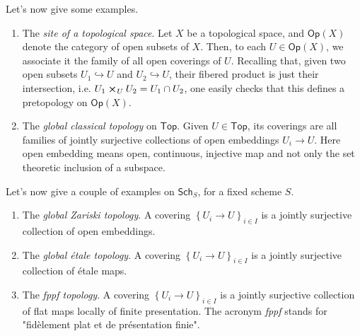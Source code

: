 \noindent
Let's now give some examples.
\begin{ex}\leavevmode\vspace{-.2\baselineskip}
\begin{enumerate}
	\item The {\em site of a topological space}.
		Let $X$ be a topological space, and $\mathsf{Op}(X)$ denote the category of
		open subsets of $X$.
		Then, to each $U \in \mathsf{Op}(X)$, we associate it the family of all
		open coverings of $U$.
		Recalling that, given two open subsets
		$U_1 \hookrightarrow  U$ and $U_2 \hookrightarrow  U$, 
		their fibered product is just their intersection, i.e. 
		$U_1 \cross_{ U } U_2 = U_1 \cap U_2$,
		one easily checks that this defines a pretopology on $\mathsf{Op}(X)$.


	\item The {\em global classical topology} on $\mathsf{Top}$.
		Given $U \in \mathsf{Top}$, its coverings are all families of jointly surjective
		collections of open embeddings $U_i \to U$.
		Here open embedding means open, continuous, injective map and not
		only the set theoretic inclusion of a subspace.



\end{enumerate}
Let's now give a couple of examples on $\mathsf{Sch}_{ S }$, for a fixed scheme $S$.
\begin{enumerate}[resume]
	\item The {\em global Zariski topology}.
		A covering $\left\{ U_{ i } \to U \right\}_{ i \in I }$ is a 
		jointly surjective collection of 
		open embeddings.
		

	\item The {\em global étale topology}.
		A covering $\left\{ U_{ i } \to U \right\}_{ i \in I }$ is a 
		jointly surjective collection of 
		étale maps.

	\item The {\em fppf topology}.
		A covering $\left\{ U_{ i } \to U \right\}_{ i \in I }$ is a 
		jointly surjective collection of 
		flat maps locally of finite presentation.
		The acronym {\em fppf} stands for 
		"fidèlement plat et de présentation finie".
\end{enumerate}
\end{ex}

